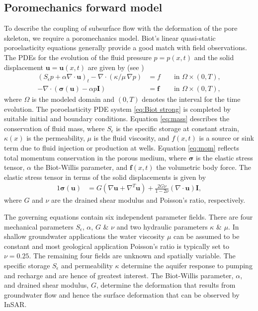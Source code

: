 \documentclass[11pt,final]{article}%
\newcommand{\I}{\boldsymbol{I}}
\newcommand{\Stor}{S_{\epsilon}}
\renewcommand{\u}{\ensuremath{\boldsymbol{u}}}
\newcommand{\s}{\boldsymbol\sigma}
\newcommand{\f}{\ensuremath{\boldsymbol{f}}}
\renewcommand{\citet}{\cite}
\begin{document}
\subsection{Poromechanics forward model}\label{sec:poromech}

To describe the coupling of subsurface flow with the deformation of the pore skeleton, we require a poromechanics model. Biot's linear quasi-static poroelasticity equations  \citet{Biot1941}
generally provide a good match with field observations. The PDEs for the evolution of the fluid pressure $p=p(x,t)$ and the solid displacement $\u=\u(x,t)$ are given by (see \citet{Wang2000})
\begin{subequations}\label{eq:Biot strong}
\begin{alignat}{2}
\left(\Stor p+\alpha\nabla\cdot\u\right)_t-\nabla\cdot\left(\kappa/\mu\, \nabla p\right)&=f &&  \text{ in }\Omega\times (0,T), \label{eq:mass}\\
 -\nabla\cdot\left(\s(\u) -\alpha p\I\right)&=\f && \text{ in }\Omega\times (0,T), \label{eq:mom}
\end{alignat}
\end{subequations}
where $\Omega$ is the modeled domain and $(0,T)$ denotes the interval for the time evolution.  The poroelasticity PDE system \eqref{eq:Biot strong} is completed by suitable initial and boundary
conditions.  Equation \eqref{eq:mass} describes the conservation of fluid mass, where $\Stor$ is the specific storage at constant strain, $\kappa(x)$ is the permeability, $\mu$ is the fluid viscosity, and
$f(x,t)$ is a source or sink term due to fluid injection or production at wells.  Equation \eqref{eq:mom} reflects total momentum conservation in the porous medium, where $\s$ is the elastic stress
tensor, $\alpha$ the Biot-Willis parameter, and $\f(x,t)$ the volumetric body force.  The elastic stress
tensor in terms of the solid displacements is given by
\begin{alignat*}{1}
 \s(\u)&=G\left(\nabla\u+\nabla^{T}\u\right)+\frac{2G\nu}{1-2\nu}\left(\nabla\cdot\u\right)\I, %
\end{alignat*}
where $G$ and $\nu$ are the drained shear modulus and Poisson's ratio, respectively.  

The governing equations contain six independent parameter fields. There are four mechanical parameters $\Stor$, $\alpha$, $G$ \& $\nu$ and two hydraulic parameters $\kappa$ \& $\mu$. In shallow groundwater applications the water viscosity $\mu$ can be assumed to be constant and most geological application Poisson's ratio is typically set to $\nu = 0.25$. The remaining four fields are unknown and spatially variable. The specific storage $\Stor$ and permeability $\kappa$ determine the aquifer response to pumping and recharge and are hence of greatest interest. The Biot-Willis parameter, $\alpha$, and drained shear modulus, $G$, determine the deformation that results from groundwater flow and hence the surface deformation that can be observed by InSAR.
\end{document}
